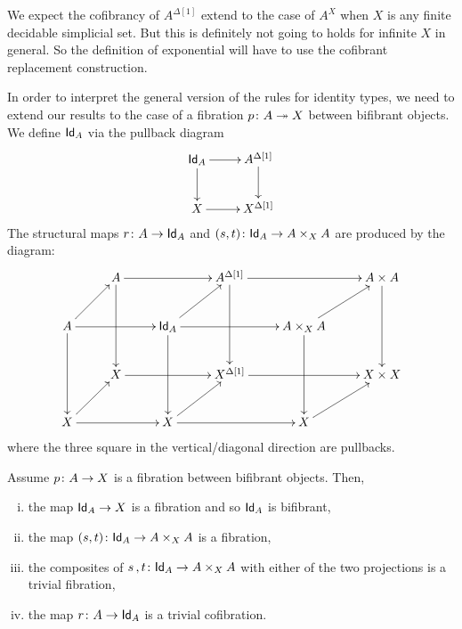 \documentclass[reqno,10pt,a4paper,oneside,draft]{amsart}
\begin{document}
\begin{remark}
We expect the cofibrancy of $A^{\Delta[1]}$ extend to the case of $A^{X}$ when $X$ is any finite decidable simplicial set. But this is definitely not going to holds for infinite $X$ in general. So the definition of exponential will have to use the cofibrant replacement construction.
\end{remark} 


\bigskip


In order to interpret the general version of the rules for identity types, we need to extend our results
to the case of a fibration $p \colon A \twoheadrightarrow X$ between bifibrant objects. We define $\mathsf{Id}_A$ 
via the pullback diagram
\[
\xymatrix{
\Id_A \ar[r] \ar[d] & A^{\Delta[1]} \ar[d] \\
X \ar[r] & X^{\Delta[1]} \\
}
\]
The structural maps $r \colon A \rightarrow \mathsf{Id}_A$ and $(s, t) \colon \mathsf{Id}_A \rightarrow A \times_{X} A$ are produced by the diagram:
\[
\xymatrix{
& A \ar[rr] \ar[dd] & & A^{\Delta[1]} \ar[rr] \ar[dd] & & A \times A \ar[dd] \\
A \ar[ur] \ar[rr] \ar[dd] & & \Id_A \ar[ur] \ar[rr] \ar[dd] & & A \times_{X} A \ar[ur] \ar[dd] \\
& X \ar[rr] & & X^{\Delta[1]} \ar[rr] & & X \times X \\
X \ar[ur] \ar[rr] & & X \ar[rr] \ar[ur] & & X \ar[ur] \\ 
}
\]
where the three square in the vertical/diagonal direction are pullbacks.


\begin{proposition}
\label{proposition:MainPathObject}
Assume $p \colon A \rightarrow X $ is a fibration between bifibrant objects. Then,
\begin{enumerate}[(i)] 
\item the map $\mathsf{Id}_A \rightarrow X$ is a fibration and so $\mathsf{Id}_A$ is bifibrant, 
\item the map $(s, t) \colon \mathsf{Id}_A \rightarrow A \times_{X} A$ is a fibration,
\item the composites of $s \, , t \colon \mathsf{Id}_A \rightarrow A \times_{X} A$  with either of the two projections is a trivial fibration,
\item the map $r \colon A \rightarrow \mathsf{Id}_A$ is a trivial cofibration.
\end{enumerate}
\end{proposition}
\end{document}
